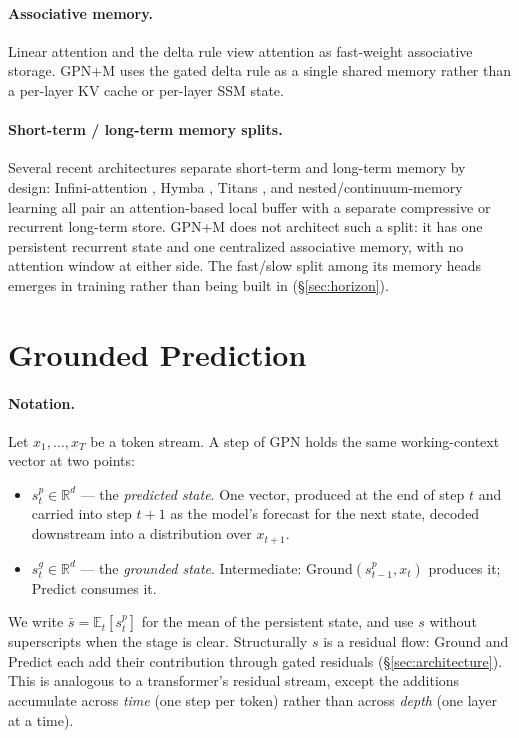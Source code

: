 \documentclass{article}
\begin{document}
\paragraph{Associative memory.} Linear attention
\cite{katharopoulos2020transformers} and the delta rule
\cite{schlag2021linear,yang2024parallelizing,yang2024gated} view
attention as fast-weight associative storage. GPN+M uses the gated
delta rule as a single shared memory rather than a per-layer KV
cache or per-layer SSM state.

\paragraph{Short-term / long-term memory splits.} Several recent
architectures separate short-term and long-term memory by design:
Infini-attention \cite{munkhdalai2024infini}, Hymba
\cite{dong2024hymba}, Titans \cite{behrouz2025titans}, and
nested/continuum-memory learning \cite{behrouz2025nested} all pair
an attention-based local buffer with a separate compressive or
recurrent long-term store. GPN+M does not architect such a split:
it has one persistent recurrent state and one centralized associative
memory, with no attention window at either side. The fast/slow split
among its memory heads emerges in training rather than being built
in (\S\ref{sec:horizon}).

\section{Grounded Prediction}
\label{sec:gp}

\paragraph{Notation.} Let $x_1, \ldots, x_T$ be a token stream. A
step of GPN holds the same working-context vector at two points:
\begin{itemize}
\setlength{\itemsep}{0pt}
\item $s^p_t \in \mathbb{R}^d$ --- the \emph{predicted state}. One
vector, produced at the end of step $t$ and carried into step
$t+1$ as the model's forecast for the next state, decoded
downstream into a distribution over $x_{t+1}$.
\item $s^g_t \in \mathbb{R}^d$ --- the \emph{grounded state}.
Intermediate: Ground$(s^p_{t-1}, x_t)$ produces it; Predict
consumes it.
\end{itemize}
We write $\bar s = \mathbb{E}_t[s^p_t]$ for the mean of the
persistent state, and use $s$ without superscripts when the stage
is clear. Structurally $s$ is a residual flow: Ground and Predict
each add their contribution through gated residuals
(\S\ref{sec:architecture}). This is analogous to a transformer's
residual stream, except the additions accumulate across \emph{time}
(one step per token) rather than across \emph{depth} (one layer at
a time).
\end{document}
